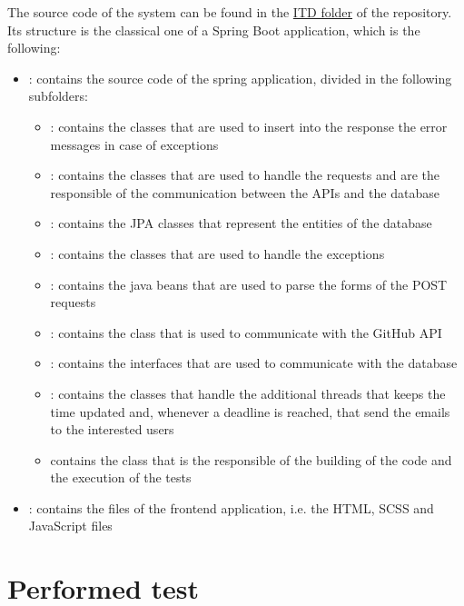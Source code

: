 The source code of the system can be found in the \href{https://github.com/pontig/sw-eng-2-PasiniPontiggiaStasi/tree/main/ITD/CodeKataBattle}{ITD folder} of the repository.\\
Its structure is the classical one of a Spring Boot application, which is the following:
\begin{itemize}
    \item {}: contains the source code of the spring application, divided in the following subfolders:
          \begin{itemize}
              \item {}: contains the classes that are used to insert into the response the error messages in case of exceptions
              \item {}: contains the classes that are used to handle the requests and are the responsible of the communication between the APIs and the database
              \item {}: contains the JPA classes that represent the entities of the database
              \item {}: contains the classes that are used to handle the exceptions
              \item {}: contains the java beans that are used to parse the forms of the POST requests
              \item {}: contains the class that is used to communicate with the GitHub API
              \item {}: contains the interfaces that are used to communicate with the database
              \item {}: contains the classes that handle the additional threads that keeps the time updated and, whenever a deadline is reached, that send the emails to the interested users
              \item {} contains the class that is the responsible of the building of the code and the execution of the tests
          \end{itemize}
    \item {}: contains the files of the frontend application, i.e. the HTML, SCSS and JavaScript files
\end{itemize}

\chapter{Performed test}

